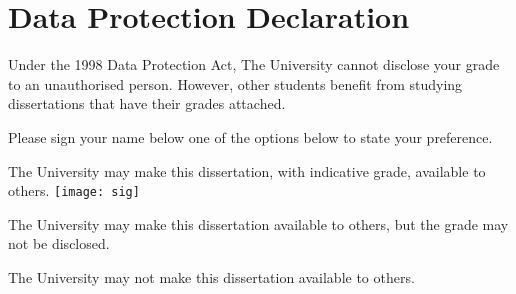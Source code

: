 
\section*{Data Protection Declaration}
\vspace{0.5cm}
\begin{flushleft}
Under the 1998 Data Protection Act, The University cannot disclose your grade to an unauthorised person. However, other students benefit from studying dissertations that have their grades attached. \newline

\vspace{0.5cm}

Please sign your name below one of the options below to state your preference.\newline
\vspace{0.5cm}

The University may make this dissertation, with indicative grade, available to others.\newline
\texttt{[image: sig]}
\vspace{1cm}


The University may make this dissertation available to others, but the grade may not be disclosed.\newline
\vspace{2cm}


The University may not make this dissertation available to others.\newline
\end{flushleft}


